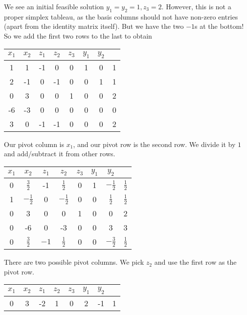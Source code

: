 \documentclass[a4paper]{article}
\begin{document}
\begin{eg}
  We see an initial feasible solution $y_1 = y_2 = 1, z_3 = 2$. However, this is not a proper simplex tableau, as the basis columns should not have non-zero entries (apart from the identity matrix itself). But we have the two $-1$s at the bottom! So we add the first two rows to the last to obtain
  \begin{center}
    \begin{tabular}{cccccccc}
      \toprule
      $x_1$ & $x_2$ & $z_1$ & $z_2$ & $z_3$ & $y_1$ & $y_2$ \\
      \midrule
      1 & 1 & -1 & 0 & 0 & 1 & 0 & 1\\
      2 & -1 & 0 & -1 & 0 & 0 & 1 & 1\\
      0 & 3 & 0 & 0 & 1 & 0 & 0 & 2\\
      \midrule
      -6 & -3 & 0 & 0 & 0 & 0 & 0 & 0\\
      3 & 0 & -1 & -1 & 0 & 0 & 0 & 2\\
      \bottomrule
    \end{tabular}
  \end{center}
  Our pivot column is $x_1$, and our pivot row is the second row. We divide it by $1$ and add/subtract it from other rows.
  \begin{center}
    \begin{tabular}{cccccccc}
      \toprule
      $x_1$ & $x_2$ & $z_1$ & $z_2$ & $z_3$ & $y_1$ & $y_2$ \\
      \midrule
      0 & $\frac{3}{2}$ & -1 & $\frac{1}{2}$ & 0 & 1 & $-\frac{1}{2}$ & $\frac{1}{2}$\\
      1 & $-\frac{1}{2}$ & 0 & $-\frac{1}{2}$ & 0 & 0 & $\frac{1}{2}$ & $\frac{1}{2}$\\
      0 & 3 & 0 & 0 & 1 & 0 & 0 & 2\\
      \midrule
      0 & -6 & 0 & -3 & 0 & 0 & 3 & 3\\
      0 & $\frac{3}{2}$ & $-1$ & $\frac{1}{2}$ & 0 & 0 & $-\frac{3}{2}$ & $\frac{1}{2}$\\
      \bottomrule
    \end{tabular}
  \end{center}
  There are two possible pivot columns. We pick $z_2$ and use the first row as the pivot row.
  \begin{center}
    \begin{tabular}{cccccccc}
      \toprule
      $x_1$ & $x_2$ & $z_1$ & $z_2$ & $z_3$ & $y_1$ & $y_2$ \\
      \midrule
      0 & 3 & -2 & 1 & 0 & 2 & -1 & 1\\

\end{tabular}
\end{center}
\end{eg}
\end{document}
